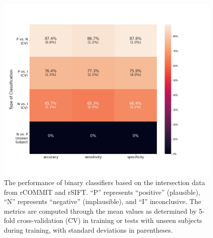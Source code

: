 \begin{figure}[ht]
    \centering
    \includegraphics[width= 12cm]{figures/inter_classifiers.png}
    \caption{The performance of binary classifiers based on the intersection data from rCOMMIT and rSIFT.
    “P” represents “positive” (plausible),  “N” represents “negative” (implausible), and “I” inconclusive. 
    The metrics are computed through the mean values as determined by 5-fold cross-validation (CV) in training or tests with unseen subjects during training, 
    with standard deviations in parentheses.}
\label{fig:inter_classifiers}
\end{figure}
